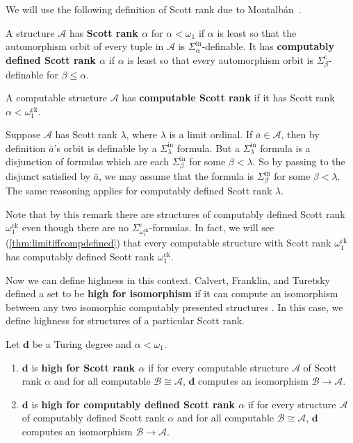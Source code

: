 \documentclass[10pt,a4paper]{amsart}
\newcommand\+[1]{\mathcal{#1}}
\renewcommand\*[1]{\mathbf{#1}}
\renewcommand\=[1]{\text{#1}}
\renewcommand\*[1]{\mathbf{#1}}
\newcommand{\A}{\mathcal{A}}
\newcommand{\B}{\mathcal{B}}
\newcommand{\Sinf}[1]{\Sigma^{\mathrm{in}}_{#1}}
\newcommand{\Sicom}[1]{\Sigma^{\mathrm{c}}_{#1}}
\newcommand{\ock}{\omega_{1}^{\mathrm{ck}}}
\newcommand{\define}[1]{\textbf{#1}}
\begin{document}
We will use the following definition of Scott rank due to Montalbán~\cite{montalban2015a}.
\begin{definition}
  A structure $\A$ has \define{Scott rank $\alpha$} for $\alpha<\omega_1$ if $\alpha$ is least so that the automorphism orbit of every tuple in $\A$ is $\Sinf{\alpha}$-definable.
  It has \define{computably defined Scott rank $\alpha$} if $\alpha$ is least so that every automorphism orbit is $\Sicom\beta$-definable for $\beta\leq \alpha$.
\end{definition}
A computable structure $\A$ has \define{computable Scott rank} if it has Scott rank $\alpha<\ock$. 
\begin{remark}
Suppose $\A$ has Scott rank $\lambda$, where $\lambda$ is a limit ordinal. If $\bar a \in \A$, then by definition $\bar a$'s orbit is definable by a $\Sinf{\lambda}$ formula.  But a $\Sinf{\lambda}$ formula is a disjunction of formulas which are each $\Sinf{\beta}$ for some $\beta < \lambda$.  So by passing to the disjunct satisfied by $\bar a$, we may assume that the formula is $\Sinf{\beta}$ for some $\beta < \lambda$.
The same reasoning applies for computably defined Scott rank $\lambda$.
\end{remark}
Note that by this remark there are structures of computably defined Scott rank $\ock$ even though there are no $\Sicom\ock$-formulas. In fact, we will see (\cref{thm:limitiffcompdefined}) that every computable structure with Scott rank $\ock$ has computably defined Scott rank $\ock$.

Now we can define highness in this context. Calvert, Franklin, and Turetsky defined a set to be \define{high for isomorphism} if it can compute an isomorphism between any two isomorphic computably presented structures \cite{cft23}. In this case, we define highness for structures of a particular Scott rank.

\begin{definition} Let $\mathbf d$ be a Turing degree and $\alpha<\omega_1$.
  \begin{enumerate}
    \item $\mathbf d$ is \define{high for Scott rank $\alpha$} if for every computable structure $\A$ of Scott rank $\alpha$ and for all computable $\B\cong \A$, $\mathbf d$ computes an isomorphism $\B\to \A$.
    \item $\*d$ is \define{high for computably defined Scott rank $\alpha$} if for every structure $\A$ of computably defined Scott rank $\alpha$ and for all computable $\B\cong \A$, $\*d$ computes an isomorphism $\B\to\A$.
  \end{enumerate}
\end{definition}
\end{document}
